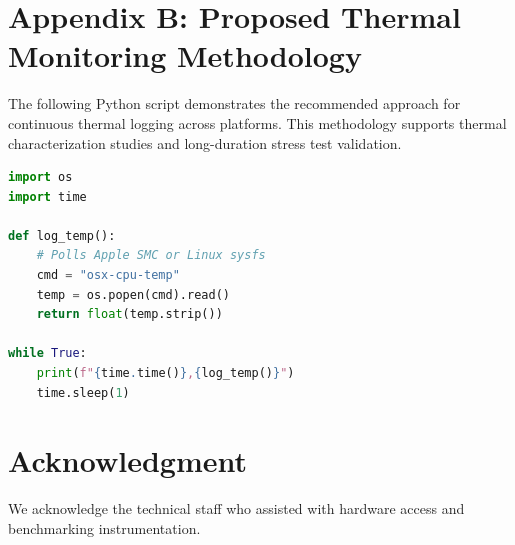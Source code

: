 \documentclass[conference]{IEEEtran}
\begin{document}
\section*{Appendix B: Proposed Thermal Monitoring Methodology}
The following Python script demonstrates the recommended approach for continuous thermal logging across platforms. This methodology supports thermal characterization studies and long-duration stress test validation.

\begin{lstlisting}[language=python, caption=Thermal Logger (Proposed Validation Tool)]
import os
import time

def log_temp():
    # Polls Apple SMC or Linux sysfs
    cmd = "osx-cpu-temp" 
    temp = os.popen(cmd).read()
    return float(temp.strip())

while True:
    print(f"{time.time()},{log_temp()}")
    time.sleep(1)
\end{lstlisting}

\section*{Acknowledgment}
We acknowledge the technical staff who assisted with hardware access and benchmarking instrumentation.
\end{document}
